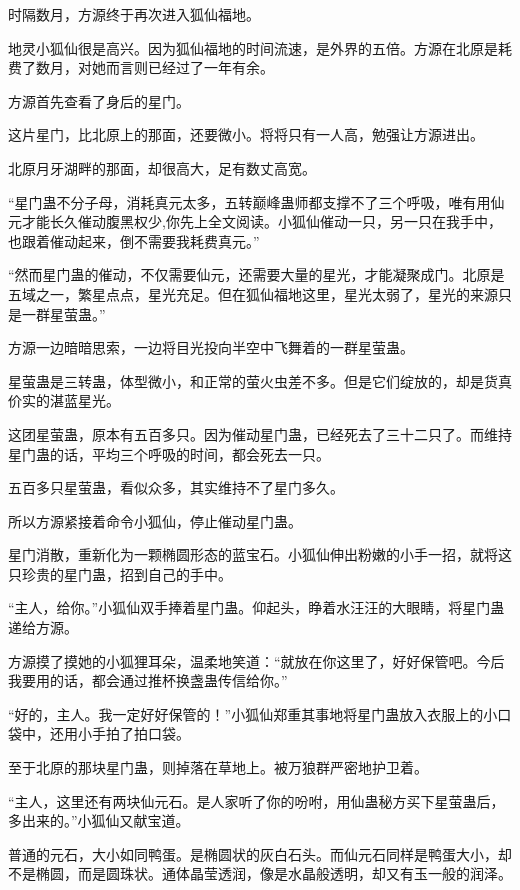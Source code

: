 
\begin{this_body}

时隔数月，方源终于再次进入狐仙福地。

地灵小狐仙很是高兴。因为狐仙福地的时间流速，是外界的五倍。方源在北原是耗费了数月，对她而言则已经过了一年有余。

方源首先查看了身后的星门。

这片星门，比北原上的那面，还要微小。将将只有一人高，勉强让方源进出。

北原月牙湖畔的那面，却很高大，足有数丈高宽。

“星门蛊不分子母，消耗真元太多，五转巅峰蛊师都支撑不了三个呼吸，唯有用仙元才能长久催动腹黑权少,你先上全文阅读。小狐仙催动一只，另一只在我手中，也跟着催动起来，倒不需要我耗费真元。”

“然而星门蛊的催动，不仅需要仙元，还需要大量的星光，才能凝聚成门。北原是五域之一，繁星点点，星光充足。但在狐仙福地这里，星光太弱了，星光的来源只是一群星萤蛊。”

方源一边暗暗思索，一边将目光投向半空中飞舞着的一群星萤蛊。

星萤蛊是三转蛊，体型微小，和正常的萤火虫差不多。但是它们绽放的，却是货真价实的湛蓝星光。

这团星萤蛊，原本有五百多只。因为催动星门蛊，已经死去了三十二只了。而维持星门蛊的话，平均三个呼吸的时间，都会死去一只。

五百多只星萤蛊，看似众多，其实维持不了星门多久。

所以方源紧接着命令小狐仙，停止催动星门蛊。

星门消散，重新化为一颗椭圆形态的蓝宝石。小狐仙伸出粉嫩的小手一招，就将这只珍贵的星门蛊，招到自己的手中。

“主人，给你。”小狐仙双手捧着星门蛊。仰起头，睁着水汪汪的大眼睛，将星门蛊递给方源。

方源摸了摸她的小狐狸耳朵，温柔地笑道：“就放在你这里了，好好保管吧。今后我要用的话，都会通过推杯换盏蛊传信给你。”

“好的，主人。我一定好好保管的！”小狐仙郑重其事地将星门蛊放入衣服上的小口袋中，还用小手拍了拍口袋。

至于北原的那块星门蛊，则掉落在草地上。被万狼群严密地护卫着。

“主人，这里还有两块仙元石。是人家听了你的吩咐，用仙蛊秘方买下星萤蛊后，多出来的。”小狐仙又献宝道。

普通的元石，大小如同鸭蛋。是椭圆状的灰白石头。而仙元石同样是鸭蛋大小，却不是椭圆，而是圆珠状。通体晶莹透润，像是水晶般透明，却又有玉一般的润泽。


\end{this_body}
